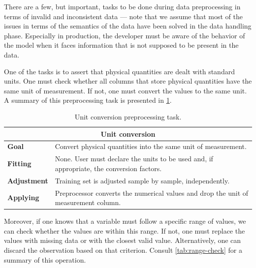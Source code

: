 There are a few, but important, tasks to be done during data preprocessing in terms of
invalid and inconsistent data --- note that we assume that most of the issues in terms of
the semantics of the data have been solved in the data handling phase.  Especially in
production, the developer must be aware of the behavior of the model when it faces
information that is not supposed to be present in the data.

One of the tasks is to assert that physical quantities are dealt with standard units.  One must
check whether all columns that store physical quantities have the same unit of
measurement.  If not, one must convert the values to the same unit.  A summary of this
preprocessing task is presented in \cref{tab:unit-conversion}.

\begin{table}\caption{Unit conversion preprocessing task.}
  \centering
  \begin{tabular}{lp{6cm}}
    \toprule
    \multicolumn{2}{c}{\textbf{Unit conversion}} \\
    \midrule
    \textbf{Goal} &
      Convert physical quantities into the same unit of measurement. \\
    \textbf{Fitting} &
      None. User must declare the units to be used and, if appropriate, the conversion
      factors. \\
    \textbf{Adjustment} &
      Training set is adjusted sample by sample, independently. \\
    \textbf{Applying} &
      Preprocessor converts the numerical values and drop the unit of measurement column.  \\
    \bottomrule
  \end{tabular}
  \label{tab:unit-conversion}
\end{table}

Moreover, if one knows that a variable must follow a specific range of values, we can check
whether the values are within this range.  If not, one must replace the values with
missing data or with the closest valid value.  Alternatively, one can discard the
observation based on that criterion.  Consult \cref{tab:range-check} for a summary of this
operation.

